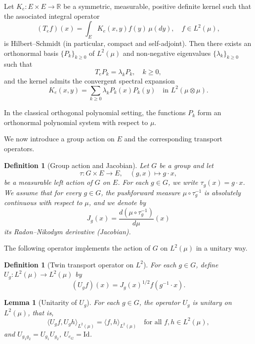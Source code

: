 \documentclass[11pt,a4paper]{article}
\newtheorem{lemma}[theorem]{Lemma}
\newtheorem{definition}[theorem]{Definition}
\newcommand{\R}{\mathbb{R}}
\newcommand{\ip}[2]{\langle #1, #2 \rangle}
\begin{document}
Let $K_e : E \times E \to \R$ be a symmetric, measurable, positive definite kernel such that the associated integral operator
\begin{equation}\label{eq:integral_op}
(T_e f)(x) = \int_E K_e(x, y) f(y) \, \mu(dy), \quad f \in L^2(\mu),
\end{equation}
is Hilbert--Schmidt (in particular, compact and self-adjoint). Then there exists an orthonormal basis $\{P_k\}_{k \geq 0}$ of $L^2(\mu)$ and non-negative eigenvalues $\{\lambda_k\}_{k \geq 0}$ such that
\begin{equation}\label{eq:eigen}
T_e P_k = \lambda_k P_k, \quad k \geq 0,
\end{equation}
and the kernel admits the convergent spectral expansion
\begin{equation}\label{eq:spectral_expansion}
K_e(x, y) = \sum_{k \geq 0} \lambda_k P_k(x) P_k(y) \quad \text{in } L^2(\mu \otimes \mu).
\end{equation}

In the classical orthogonal polynomial setting, the functions $P_k$ form an orthonormal polynomial system with respect to $\mu$.

We now introduce a group action on $E$ and the corresponding transport operators.

\begin{definition}[Group action and Jacobian]\label{def:group_action}
Let $G$ be a group and let
\[
\tau : G \times E \to E, \quad (g, x) \mapsto g \cdot x,
\]
be a measurable left action of $G$ on $E$. For each $g \in G$, we write $\tau_g(x) = g \cdot x$. We assume that for every $g \in G$, the pushforward measure $\mu \circ \tau_g^{-1}$ is absolutely continuous with respect to $\mu$, and we denote by
\[
J_g(x) = \frac{d(\mu \circ \tau_g^{-1})}{d\mu}(x)
\]
its Radon--Nikodym derivative (Jacobian).
\end{definition}

The following operator implements the action of $G$ on $L^2(\mu)$ in a unitary way.

\begin{definition}[Twin transport operator on $L^2$]\label{def:transport_op}
For each $g \in G$, define $U_g : L^2(\mu) \to L^2(\mu)$ by
\begin{equation}\label{eq:Ug}
(U_g f)(x) = J_g(x)^{1/2} f(g^{-1} \cdot x).
\end{equation}
\end{definition}

\begin{lemma}[Unitarity of $U_g$]\label{lem:unitarity}
For each $g \in G$, the operator $U_g$ is unitary on $L^2(\mu)$, that is,
\[
\ip{U_g f}{U_g h}_{L^2(\mu)} = \ip{f}{h}_{L^2(\mu)} \quad \text{for all } f, h \in L^2(\mu),
\]
and $U_{g_1 g_2} = U_{g_1} U_{g_2}$, $U_{e_G} = \mathrm{Id}$.
\end{lemma}
\end{document}
